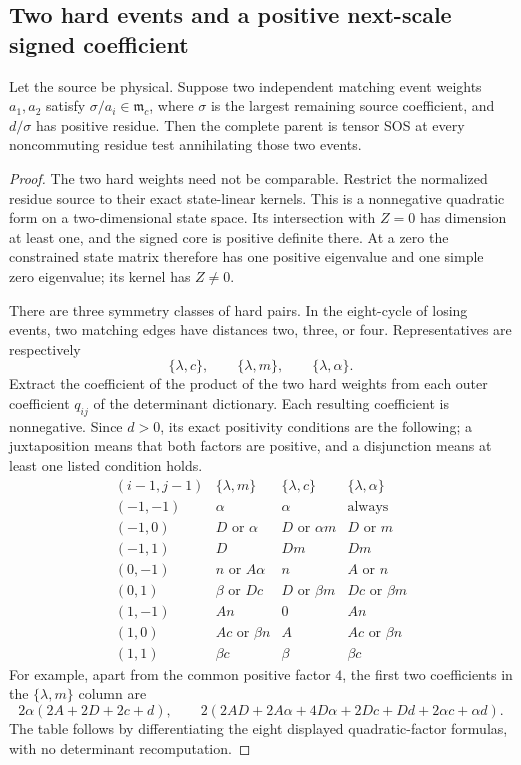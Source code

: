 \subsection{Two hard events and a positive next-scale signed coefficient}
\begin{proposition}\label{prop:two-hard-event}
Let the source be physical. Suppose two independent matching event weights $a_1,a_2$ satisfy $\sigma/a_i\in\mathfrak m_c$, where $\sigma$ is the largest remaining source coefficient, and $d/\sigma$ has positive residue. Then the complete parent is tensor SOS at every noncommuting residue test annihilating those two events.
\end{proposition}
\begin{proof}
The two hard weights need not be comparable. Restrict the normalized residue source to their exact state-linear kernels. This is a nonnegative quadratic form on a two-dimensional state space. Its intersection with $Z=0$ has dimension at least one, and the signed core is positive definite there. At a zero the constrained state matrix therefore has one positive eigenvalue and one simple zero eigenvalue; its kernel has $Z\ne0$.

There are three symmetry classes of hard pairs. In the eight-cycle of losing events, two matching edges have distances two, three, or four. Representatives are respectively
\[
 \{\lambda,c\},\qquad\{\lambda,m\},\qquad
 \{\lambda,\alpha\}.
\]
Extract the coefficient of the product of the two hard weights from each outer coefficient $q_{ij}$ of the determinant dictionary. Each resulting coefficient is nonnegative. Since $d>0$, its exact positivity conditions are the following; a juxtaposition means that both factors are positive, and a disjunction means at least one listed condition holds.
\[
\begin{array}{c|c|c|c}
(i-1,j-1)&\{\lambda,m\}&\{\lambda,c\}&\{\lambda,\alpha\}\\\hline
(-1,-1)&\alpha&\alpha&\text{always}\\
(-1,0)&D\text{ or }\alpha&D\text{ or }\alpha m&D\text{ or }m\\
(-1,1)&D&Dm&Dm\\
(0,-1)&n\text{ or }A\alpha&n&A\text{ or }n\\
(0,1)&\beta\text{ or }Dc&D\text{ or }\beta m&Dc\text{ or }\beta m\\
(1,-1)&An&0&An\\
(1,0)&Ac\text{ or }\beta n&A&Ac\text{ or }\beta n\\
(1,1)&\beta c&\beta&\beta c
\end{array}
\]
For example, apart from the common positive factor $4$, the first two coefficients in the $\{\lambda,m\}$ column are
\[
 2\alpha(2A+2D+2c+d),\qquad
 2(2AD+2A\alpha+4D\alpha+2Dc+Dd+2\alpha c+\alpha d).
\]
The table follows by differentiating the eight displayed quadratic-factor formulas, with no determinant recomputation.


\end{proof}

